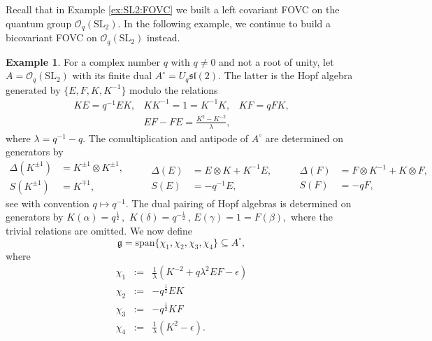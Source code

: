 \documentclass{article}
\theoremstyle{definition}
\newtheorem{example}[thm]{Example}
\newcommand{\cO}{{\mathcal{O}}}
\newcommand{\rSL}{{\mathrm{SL}}}
\newcommand{\fg}{{\mathfrak{g}}}
\begin{document}
	Recall that in Example \ref{ex:SL2:FOVC} we built a left covariant FOVC on the quantum group $\cO_q(\rSL_2)$. In the following example, we continue to build a bicovariant FOVC on $\cO_q(\rSL_2)$ instead.
	\begin{example}\label{ex-pair1}
		For a complex number $q$ with $q\neq 0$ and not a root of unity, let $A=\cO_q(\rSL_2)$ with its finite dual $A^\circ=U_q\mathfrak{sl}(2)$. The latter is the Hopf algebra generated by $\{
		E,F,K,K^{-1}\}$ modulo the relations
		$$
		\begin{array}{ccc}
			KE=q^{-1}EK,      & KK^{-1}=1=K^{-1}K,  & KF=q FK,\\[5mm]
			& EF-FE=\frac{K^2-K^{-2}}{\lambda}, &
		\end{array}
		$$
		where $\lambda=q^{-1}-q$. The comultiplication and antipode of $A^\circ$ are determined on generators by
		\begin{equation*}
			\begin{split}
				\Delta(K^{\pm 1})
				&=K^{\pm 1}\otimes K^{\pm 1},\\
				S(K^{\pm 1})
				&=K^{\mp 1},
			\end{split}\qquad
			\begin{split}
				\Delta(E)
				&=E\otimes K+K^{-1}E,\\
				S(E)
				&=-q^{-1}E,
			\end{split}\qquad
			\begin{split}
				\Delta(F)
				&=F\otimes K^{-1}+K\otimes F,\\
				S(F)
				&=-qF,
			\end{split}
		\end{equation*}
		see \cite[Section 3.1.2]{ks} with convention $q\mapsto q^{-1}$. The dual pairing of Hopf algebras is determined on generators by
		$
		K(\alpha)=q^{\frac 1 2}\,,\,\, K(\delta)=q^{-\frac 1 2}\,,\, E(\gamma)=1=F(\beta),
		$
		where the trivial relations are omitted. We now define
		\begin{equation}\label{tg-space-sl}
			\fg=\mathrm{span}\{\chi_1,\chi_2,\chi_3,\chi_4\}\subseteq A^\circ,
		\end{equation}
		where
		\begin{equation}\label{chis}
			\begin{array}{rcl}
				\chi_1&:=&\frac{1}{\lambda}(K^{-2}+q\lambda^2 EF-\epsilon) \\[3mm]
				\chi_2&:=&-q^{\frac 1 2}EK \\[3mm]
				\chi_3&:=&-q^{\frac 1 2}KF\\[3mm]
				\chi_4&:=&\frac{1}{\lambda}(K^2-\epsilon). 

\end{array}
\end{equation}
\end{example}
\end{document}
